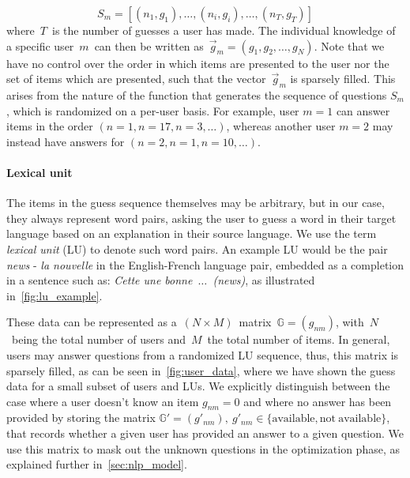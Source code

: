 $$S_m = [(n_1, g_1), \dots, (n_i, g_i), \dots, (n_T, g_T)]$$
where~$T$~is the number of guesses a user has made. The individual knowledge of a specific user~$m$~can then be written as~$\vec{g}_m = (g_1, g_2, \dots, g_N)$. Note that we have no control over the order in which items are presented to the user nor the set of items which are presented, such that the vector~$\vec{g}_m$ is sparsely filled. This arises from the nature of the function that generates the sequence of questions $S_m$, which is randomized on a per-user basis. For example, user $m=1$ can answer items in the order $(n=1, n=17, n=3, \dots)$, whereas another user $m=2$ may instead have answers for $(n=2, n=1, n=10, \dots)$. 

\paragraph{Lexical unit}
The items in the guess sequence themselves may be arbitrary, but in our case, they always represent word pairs, asking the user to guess a word in their target language based on an explanation in their source language. We use the term \textit{lexical unit} (LU) to denote such word pairs. An example LU would be the pair \textit{news} - \textit{la nouvelle} in the English-French language pair, embedded as a completion in a sentence such as: \textit{Cette une bonne~$\dots$~(news)}, as illustrated in~\cref{fig:lu_example}.

These data can be represented as a~$(N \times M)$~matrix~$\mathbb{G} = (g_{nm})$, with~$N$~being the total number of users and~$M$~the total number of items. In general, users may answer questions from a randomized LU sequence, thus, this matrix is sparsely filled, as can be seen in~\cref{fig:user_data}, where we have shown the guess data for a small subset of users and LUs. We explicitly distinguish between the case where a user doesn't know an item $g_{nm} = 0$ and where no answer has been provided by storing the matrix $\mathbb{G}' = (g'_{nm}),\ g'_{nm} \in \{\mathrm{available}, \mathrm{not~available}\}$, that records whether a given user has provided an answer to a given question. We use this matrix to mask out the unknown questions in the optimization phase, as explained further in~\cref{sec:nlp_model}.

